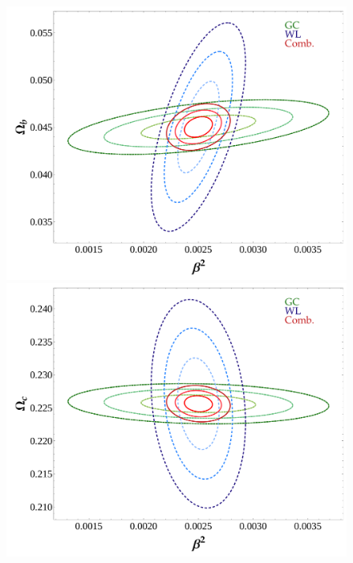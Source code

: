 \begin{figure}
\begin{centering}
\includegraphics[height=0.15\paperheight]{Chapters/fitting-funcs/figures/GC-WL-Comb-kNyHalf-margedCont-Grid4}
\hfill{}\includegraphics[height=0.15\paperheight]{Chapters/fitting-funcs/figures/GC-WL-Comb-kNyHalf-margedCont-Grid5}
\hfill{}
\par\end{centering}



\end{figure}
